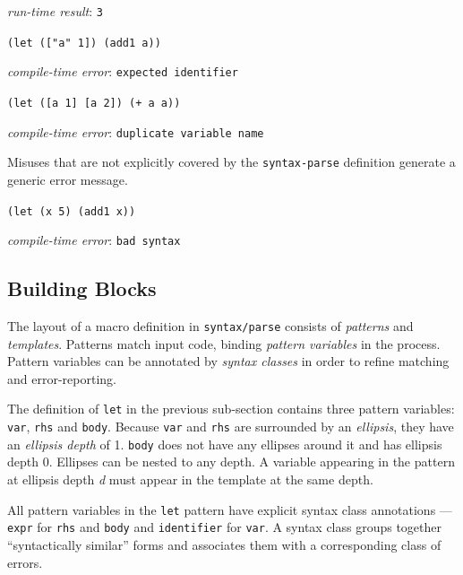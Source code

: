 \documentclass{juliacon}
\begin{document}
\noindent\hspace{0.3cm}\textit{run-time result}: \texttt{3}

\vspace{0.25cm}

\noindent
\texttt{(let (["a" 1]) (add1 a))}

\noindent\hspace{0.3cm}\textit{compile-time error}: \texttt{expected identifier}

\vspace{0.25cm}

\noindent
\texttt{(let ([a 1] [a 2]) (+ a a))}

\noindent\hspace{0.3cm}\textit{compile-time error}: \texttt{duplicate variable name}

\vspace{1em}

Misuses that are not explicitly covered by the \texttt{syntax-parse}
definition generate a generic error message.

\vspace{1em}

\noindent
\texttt{(let (x 5) (add1 x))}

\noindent\hspace{0.3cm}\textit{compile-time error}: \texttt{bad syntax}

\subsection{Building Blocks}
\label{sec:org3aeafde}

The layout of a macro definition in \texttt{syntax/parse} consists of
\emph{patterns} and \emph{templates}. Patterns match input code, binding
\emph{pattern variables} in the process. Pattern variables can be annotated
by \emph{syntax classes} in order to refine matching and error-reporting.

The definition of \texttt{let} in the previous sub-section contains three
pattern variables: \texttt{var}, \texttt{rhs} and \texttt{body}. Because \texttt{var} and \texttt{rhs}
are surrounded by an \emph{ellipsis}, they have an \emph{ellipsis depth}
of 1. \texttt{body} does not have any ellipses around it and has ellipsis
depth 0. Ellipses can be nested to any depth. A variable appearing in
the pattern at ellipsis depth \emph{d} must appear in the template at the
same depth.

All pattern variables in the \texttt{let} pattern have explicit syntax class
annotations — \texttt{expr} for \texttt{rhs} and \texttt{body} and \texttt{identifier} for
\texttt{var}. A syntax class groups together ``syntactically similar'' forms
and associates them with a corresponding class of errors.
\end{document}
